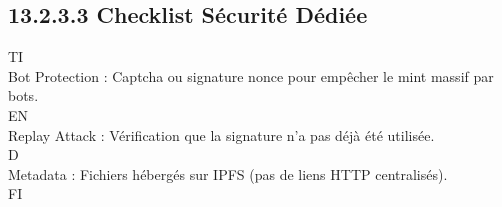 \documentclass[12pt,landscape,a4paper]{article}
\begin{document}
\subsection{13.2.3.3 Checklist Sécurité Dédiée}
\vspace{0.5em}
\vspace{0.5em}
\vspace{0.5em}
\vspace{0.5em}
TI\\
Bot Protection : Captcha ou signature nonce pour empêcher le mint massif par bots.\\
\vspace{0.5em}
\vspace{0.5em}
\vspace{0.5em}
\vspace{0.5em}
EN\\
Replay Attack : Vérification que la signature n’a pas déjà été utilisée.\\
\vspace{0.5em}
\vspace{0.5em}
\vspace{0.5em}
\vspace{0.5em}
D\\
Metadata : Fichiers hébergés sur IPFS (pas de liens HTTP centralisés).\\
\vspace{0.5em}
\vspace{0.5em}
\vspace{0.5em}
\vspace{0.5em}
FI\\
\end{document}

